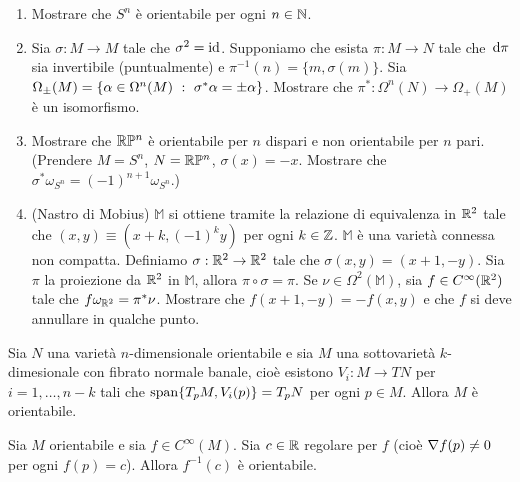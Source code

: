 \begin{exercise}
	\begin{enumerate}
		\item Mostrare che $S^n$ è orientabile per ogni $n\in\mathbb N$.
		
		\item Sia $\sigma:M\to M$ tale che $\sigma^2=\mathrm{id}$. Supponiamo che esista $\pi:M\to N$ tale che $\,\mathrm d \pi$ sia invertibile (puntualmente) e $\pi^{-1}(n) = \{m,\sigma(m)\}$. Sia $\Omega_\pm(M) = \{ \alpha\in\Omega^n(M) \ :\  \sigma^*\alpha = \pm\alpha \}$. Mostrare che $\pi^* : \Omega^n(N) \to \Omega_+(M)$ è un isomorfismo.
		
		\item Mostrare che $\mathbb R \mathbb P^n$ è orientabile per $n$ dispari e non orientabile per $n$ pari.
		(Prendere $M=S^n$, $N=\mathbb R\mathbb P^n$, $\sigma(x)=-x$. Mostrare che $\sigma^*\omega_{S^n} = (-1)^{n+1} \omega_{S^n}$.)
		
		\item (Nastro di Mobius) $\mathbb M$ si ottiene tramite la relazione di equivalenza in $\mathbb R^2$ tale che $(x,y) \equiv (x+k,(-1)^ky)$ per ogni $k\in\mathbb Z$. $\mathbb M$ è una varietà connessa non compatta. Definiamo $\sigma:\mathbb R^2\to\mathbb R^2$ tale che $\sigma(x,y) = (x+1,-y)$. Sia $\pi$ la proiezione da $\mathbb R^2$ in $\mathbb M$, allora $\pi\circ\sigma=\pi$.
		Se $\nu\in\Omega^2(\mathbb M)$, sia $f\in C^\infty(\mathbb R^2)$ tale che $f\omega_{\mathbb R^2} = \pi^*\nu$.
		Mostrare che $f(x+1,-y) = -f(x,y)$ e che $f$ si deve annullare in qualche punto.
	\end{enumerate}
\end{exercise}

\begin{proposition} 
	Sia $N$ una varietà $n$-dimensionale orientabile e sia $M$ una sottovarietà $k$-dimesionale con fibrato normale banale, cioè esistono $V_i:M\to TN$ per $i=1,\ldots,n-k$ tali che $\mathrm{span}\{ T_pM,V_i(p) \} = T_pN$ per ogni $p\in M$.
	Allora $M$ è orientabile.
\end{proposition}

\begin{corollary}
	Sia $M$ orientabile e sia $f \in C^\infty(M)$. Sia $c\in\mathbb R$ regolare per $f$ (cioè $\nabla f (p)\not=0$ per ogni $f(p)=c$). Allora $f^{-1}(c)$ è orientabile. 
\end{corollary}

